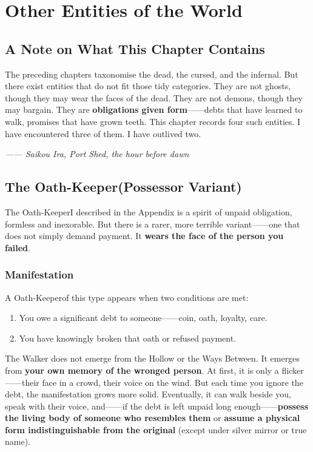 \chapter{Other Entities of the World}

\section*{A Note on What This Chapter Contains}

The preceding chapters taxonomise the dead, the cursed, and the infernal. But there exist entities that do not fit those tidy categories. They are not ghosts, though they may wear the faces of the dead. They are not demons, though they may bargain. They are \textbf{obligations given form}------debts that have learned to walk, promises that have grown teeth. This chapter records four such entities. I have encountered three of them. I have outlived two.

\emph{------ Saikou Ira, Port Shed, the hour before dawn}

\section{The Oath-Keeper(Possessor Variant)}

The Oath-KeeperI described in the Appendix is a spirit of unpaid obligation, formless and inexorable. But there is a rarer, more terrible variant------one that does not simply demand payment. It \textbf{wears the face of the person you failed}.

\subsection{Manifestation}

A Oath-Keeperof this type appears when two conditions are met:

\begin{enumerate}
    \item You owe a significant debt to someone------coin, oath, loyalty, care.
    \item You have knowingly broken that oath or refused payment.
\end{enumerate}

The Walker does not emerge from the Hollow or the Ways Between. It emerges from \textbf{your own memory of the wronged person}. At first, it is only a flicker------their face in a crowd, their voice on the wind. But each time you ignore the debt, the manifestation grows more solid. Eventually, it can walk beside you, speak with their voice, and------if the debt is left unpaid long enough------\textbf{possess the living body of someone who resembles them} or \textbf{assume a physical form indistinguishable from the original} (except under silver mirror or true name).

